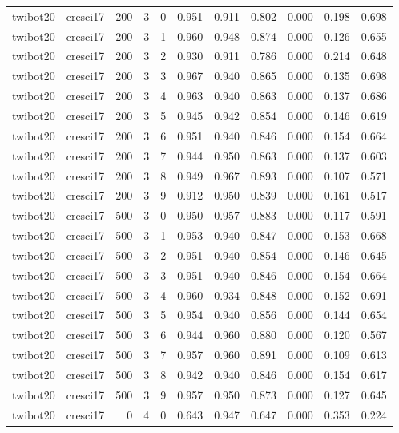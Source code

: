 \begin{tabular}{llrrrrrrrrr}
twibot20 & cresci17 & 200 & 3 & 0 & 0.951 & 0.911 & 0.802 & 0.000 & 0.198 & 0.698 \\
twibot20 & cresci17 & 200 & 3 & 1 & 0.960 & 0.948 & 0.874 & 0.000 & 0.126 & 0.655 \\
twibot20 & cresci17 & 200 & 3 & 2 & 0.930 & 0.911 & 0.786 & 0.000 & 0.214 & 0.648 \\
twibot20 & cresci17 & 200 & 3 & 3 & 0.967 & 0.940 & 0.865 & 0.000 & 0.135 & 0.698 \\
twibot20 & cresci17 & 200 & 3 & 4 & 0.963 & 0.940 & 0.863 & 0.000 & 0.137 & 0.686 \\
twibot20 & cresci17 & 200 & 3 & 5 & 0.945 & 0.942 & 0.854 & 0.000 & 0.146 & 0.619 \\
twibot20 & cresci17 & 200 & 3 & 6 & 0.951 & 0.940 & 0.846 & 0.000 & 0.154 & 0.664 \\
twibot20 & cresci17 & 200 & 3 & 7 & 0.944 & 0.950 & 0.863 & 0.000 & 0.137 & 0.603 \\
twibot20 & cresci17 & 200 & 3 & 8 & 0.949 & 0.967 & 0.893 & 0.000 & 0.107 & 0.571 \\
twibot20 & cresci17 & 200 & 3 & 9 & 0.912 & 0.950 & 0.839 & 0.000 & 0.161 & 0.517 \\
twibot20 & cresci17 & 500 & 3 & 0 & 0.950 & 0.957 & 0.883 & 0.000 & 0.117 & 0.591 \\
twibot20 & cresci17 & 500 & 3 & 1 & 0.953 & 0.940 & 0.847 & 0.000 & 0.153 & 0.668 \\
twibot20 & cresci17 & 500 & 3 & 2 & 0.951 & 0.940 & 0.854 & 0.000 & 0.146 & 0.645 \\
twibot20 & cresci17 & 500 & 3 & 3 & 0.951 & 0.940 & 0.846 & 0.000 & 0.154 & 0.664 \\
twibot20 & cresci17 & 500 & 3 & 4 & 0.960 & 0.934 & 0.848 & 0.000 & 0.152 & 0.691 \\
twibot20 & cresci17 & 500 & 3 & 5 & 0.954 & 0.940 & 0.856 & 0.000 & 0.144 & 0.654 \\
twibot20 & cresci17 & 500 & 3 & 6 & 0.944 & 0.960 & 0.880 & 0.000 & 0.120 & 0.567 \\
twibot20 & cresci17 & 500 & 3 & 7 & 0.957 & 0.960 & 0.891 & 0.000 & 0.109 & 0.613 \\
twibot20 & cresci17 & 500 & 3 & 8 & 0.942 & 0.940 & 0.846 & 0.000 & 0.154 & 0.617 \\
twibot20 & cresci17 & 500 & 3 & 9 & 0.957 & 0.950 & 0.873 & 0.000 & 0.127 & 0.645 \\
twibot20 & cresci17 & 0 & 4 & 0 & 0.643 & 0.947 & 0.647 & 0.000 & 0.353 & 0.224 \\

\end{tabular}
